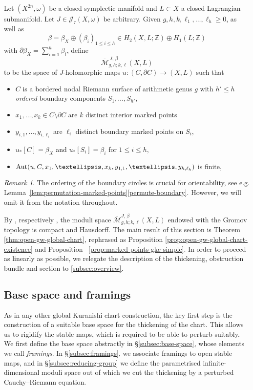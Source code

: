 \documentclass[11pt,psamsfonts, oneside, reqno]{amsart}
\newcommand{\sub}{\subset}%
\newcommand{\sm}{\ensuremath{\setminus}}%
\newcommand{\cl}{\colon}
\newcommand{\Mbar}{\overline{\mathcal M}}
\newcommand{\del}{\partial}
\newcommand{\Aut}{\normalfont\text{Aut}}
\newcommand{\bZ}{\mathbb{Z}}
\newcommand{\cJ}{\mathcal{J}}
\theoremstyle{definition}
\theoremstyle{remark}
\newtheorem{remark}[theorem]{Remark}
\numberwithin{equation}{section}
\begin{document}
\noindent
Let $(X^{2n},\omega)$ be a closed symplectic manifold and $L \sub X$ a closed Lagrangian submanifold. Let $J \in \cJ_\tau(X,\omega)$ be arbitrary. Given $g,h,k,\ell_1,\dots,\ell_h \geq 0$, as well as 
$$\beta = \beta_X\oplus (\beta_i)_{1\leq i \leq h}\in H_2(X,L;\bZ)\oplus H_1(L;\bZ)$$ \noindent
with $\del \beta_X = \sum_{i=1}^h \beta_i$, define $$\Mbar^{\,J,\,\beta}_{g,h;k,\ell}(X,L)$$
to be the space of $J$-holomorphic maps $u \cl (C,\del C)\to (X,L)$ such that 
\begin{itemize}[leftmargin=20pt]
	\item $C$ is a bordered nodal Riemann surface of arithmetic genus $g$ with $h' \leq h$ \emph{ordered} boundary components $S_1,\dots,S_{h'}$,
	\item $x_1,\dots,x_k \in C\sm \del C$ are $k$ distinct interior marked points
	\item $y_{i,1},\dots,y_{i,\ell_i}$ are $\ell_i$ distinct boundary marked points on $S_i$,
	\item $u_*[C] = \beta_X$ and $u_*[S_i] = \beta_i$ for $1 \leq i \leq h$,
	\item $\Aut(u,C,x_1,\dots,x_k,y_{1,1},\dots,y_{h,\ell_h})$ is finite,
\end{itemize}

\begin{remark}\label{rem:order-boundary-circles} The ordering of the boundary circles is crucial for orientability, see e.g. Lemma~\ref{lem:permutation-marked-points}\eqref{permute-boundary}. However, we will omit it from the notation throughout. \end{remark}

\noindent
By \cite{Ye94}, respectively \cite[Theorem 1.1]{Liu20}, the moduli space $\Mbar^{J,\,\beta}_{g,h;k,\ell}(X,L)$ endowed with the Gromov topology is compact and Hausdorff. The main result of this section is Theorem \ref{thm:open-gw-global-chart}, rephrased as Proposition \ref{prop:open-gw-global-chart-existence} and Proposition~ \ref{prop:marked-points-gkc-simple}. In order to proceed as linearly as possible, we relegate the description of the thickening, obstruction bundle and section to \textsection\ref{subsec:overview}.

\subsection{Base space and framings}\label{subsec:base-and-framings}
As in any other global Kuranishi chart construction, the key first step is the construction of a suitable base space for the thickening of the chart. This allows us to rigidify the stable maps, which is required to be able to perturb suitably. We first define the base space abstractly in \S\ref{subsec:base-space}, whose elements we call \emph{framings}. In \S\ref{subsec:framings}, we associate framings to open stable maps, and in \S\ref{subsec:reducing-group} we define the parametrised infinite-dimensional moduli space out of which we cut the thickening by a perturbed Cauchy--Riemann equation.
\end{document}

